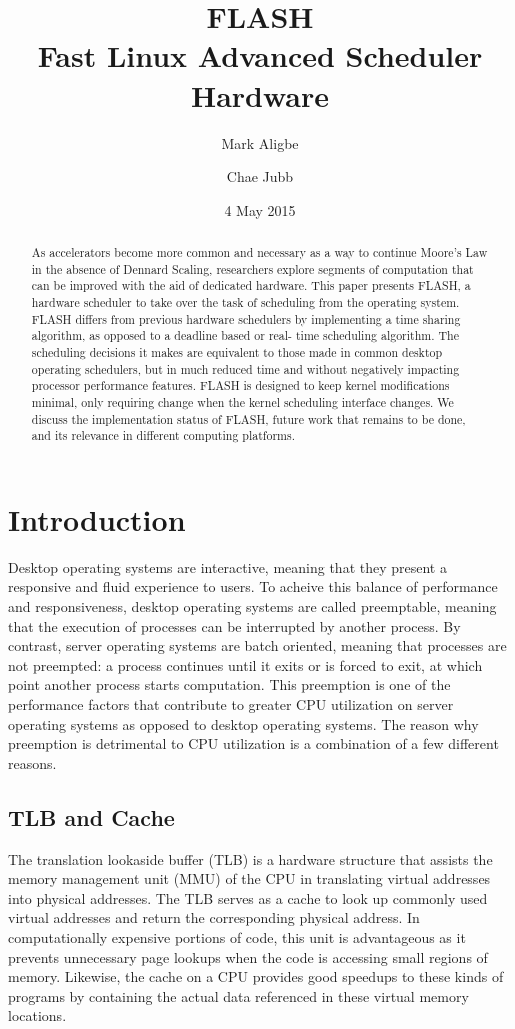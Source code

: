 \documentclass{sig-alternate-10pt}
\title{FLASH\\Fast Linux Advanced Scheduler Hardware}
\author{
	Mark Aligbe \\
	    \email{ma2799@columbia.edu}
	\and
    Chae Jubb \\
        \email{ecj2122@columbia.edu}
}
\date{4 May 2015}
\begin{document}
\maketitle

\begin{abstract}
As accelerators become more common and necessary as a way to continue Moore's
Law in the absence of Dennard Scaling, researchers explore segments of
computation that can be improved with the aid of dedicated hardware. This paper
presents FLASH, a hardware scheduler to take over the task of scheduling from
the operating system. FLASH differs from previous hardware schedulers by
implementing a time sharing algorithm, as opposed to a deadline based or real-
time scheduling algorithm. The scheduling decisions it makes are equivalent to
those made in common desktop operating schedulers, but in much reduced time and
without negatively impacting processor performance features. FLASH is designed
to keep kernel modifications minimal, only requiring change when the kernel
scheduling interface changes. We discuss the implementation status of FLASH,
future work that remains to be done, and its relevance in different computing
platforms.

\end{abstract}


\section{Introduction}
\label{sec:intro}
Desktop operating systems are interactive, meaning that they present a responsive and fluid experience to users. To acheive this balance of performance and responsiveness, desktop operating systems are called preemptable, meaning that the execution of processes can be interrupted by another process. By contrast, server operating systems are batch oriented, meaning that processes are not preempted: a process continues until it exits or is forced to exit, at which point another process starts computation. This preemption is one of the performance factors that contribute to greater CPU utilization on server operating systems as opposed to desktop operating systems. The reason why preemption is detrimental to CPU utilization is a combination of a few different reasons.

\subsection{TLB and Cache}
The translation lookaside buffer (TLB) is a hardware structure that assists the memory management unit (MMU) of the CPU in translating virtual addresses into physical addresses. The TLB serves as a cache to look up commonly used virtual addresses and return the corresponding physical address. In computationally expensive portions of code, this unit is advantageous as it prevents unnecessary page lookups when the code is accessing small regions of memory. Likewise, the cache on a CPU provides good speedups to these kinds of programs by containing the actual data referenced in these virtual memory locations.
\end{document}
